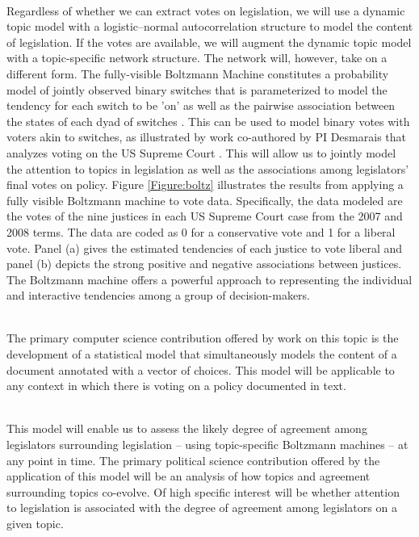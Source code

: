 ~\\
 Regardless of whether we can
extract votes on legislation, we will use a dynamic topic model with a
logistic--normal autocorrelation structure to model the content of
legislation. If the votes are available, we will augment the dynamic
topic model with a topic-specific network structure. The network will,
however, take on a different form. The fully-visible Boltzmann Machine
constitutes a probability model of jointly observed binary switches
that is parameterized to model the tendency for each switch to be 'on'
as well as the pairwise association between the states of each dyad of
switches \cite{Gunawardana2008}. This can be used to model binary
votes with voters akin to switches, as illustrated by work co-authored
by PI Desmarais that analyzes voting on the US Supreme Court
\cite{Desmarais2010}. This will allow us to jointly model the
attention to topics in legislation as well as the associations among
legislators' final votes on policy. Figure \ref{Figure:boltz}
illustrates the results from applying a fully visible Boltzmann
machine to vote data. Specifically, the data modeled are the votes of
the nine justices in each US Supreme Court case from the 2007 and 2008
terms. The data are coded as 0 for a conservative vote and 1 for a
liberal vote. Panel (a) gives the estimated tendencies of each justice
to vote liberal and panel (b) depicts the strong positive and negative
associations between justices. The Boltzmann machine offers a powerful
approach to representing the individual and interactive tendencies
among a group of decision-makers.

~\\
 The primary computer
science contribution offered by work on this topic is the development
of a statistical model that simultaneously models the content of a
document annotated with a vector of choices. This model will be
applicable to any context in which there is voting on a policy
documented in text.

~\\
 This model will enable us to assess the likely degree of agreement among legislators surrounding legislation -- using topic-specific Boltzmann machines -- at any point in time. The primary political science contribution offered by the application of this model will be an analysis of how topics and agreement surrounding topics co-evolve. Of high specific interest will be whether attention to legislation is associated with the degree of agreement among legislators on a given topic.




